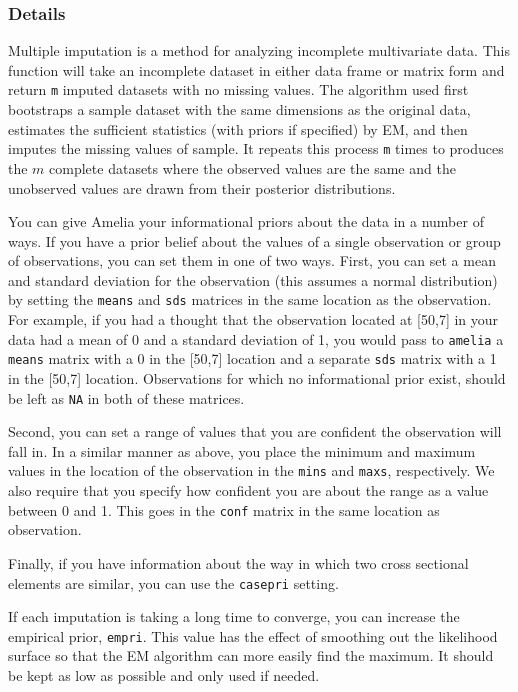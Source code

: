 \documentclass[12pt,titlepage]{article}
\begin{document}
\subsubsection*{Details}
Multiple imputation is a method for analyzing incomplete multivariate data.  This function will take an incomplete dataset in
  either data frame or matrix form and return \texttt{m} imputed datasets
  with no missing values. The algorithm used first bootstraps a sample dataset
  with the same dimensions as the original data, estimates the sufficient statistics (with priors if specified) by EM, and then imputes the missing
  values of sample.  It repeats this process \texttt{m} times to produces
  the $m$ complete datasets where the observed values are the same and the unobserved values are drawn from their posterior distributions.
  
  You can give Amelia your informational priors about the data in a number
  of ways.    If you have a prior
  belief about the values of a single observation or group of observations,
  you can set them in one of two ways.  First, you can set a mean and 
  standard deviation for the observation (this assumes a normal distribution)
  by setting the \texttt{means} and \texttt{sds} matrices in the same location
  as the observation.  For example, if you had a thought that the 
  observation located at [50,7] in your data had a mean of 0 and a standard
  deviation of 1, you would pass to \texttt{amelia} a \texttt{means} matrix
  with a 0 in the [50,7] location and a separate \texttt{sds} matrix with
  a 1 in the [50,7] location.  Observations for which no informational
  prior exist, should be left as \texttt{NA} in both of these matrices.
  
  Second, you can set a range of values that you are confident the 
  observation will fall in.  In a similar manner as above, you place the
  minimum and maximum values in the location of the observation in the
  \texttt{mins} and \texttt{maxs}, respectively.  We also require that you 
  specify how confident you are about the range as a value between 0 and 1.
  This goes in the \texttt{conf} matrix in the same location as observation.
  
  Finally, if you have information about the way in which two cross sectional elements are similar, you can use the \texttt{casepri} setting.

  If each imputation is taking a long time to converge, you can increase
  the empirical prior, \texttt{empri}.  This value has the effect of smoothing
  out the likelihood surface so that the EM algorithm can more easily find
  the maximum.  It should be kept as low as possible and only used if needed.
  
\end{document}
